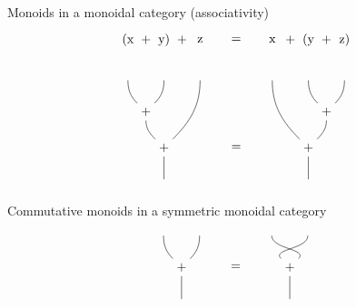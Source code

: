\documentclass[fleqn]{beamer}
\begin{document}
\begin{frame}{Monoids in a monoidal category (associativity)}
  \[
    \begin{tikzpicture}[baseline]
      \path
      (-3,2) node(xl) {}
      (-2,2) node(yl) {}
      (-1,2) node(zl) {}
      (-2.5,1) node(x+y) {+}
      (-2,0) node(xy+z) {+}
      (-2,-1) node(resl) {}
      ;
      \path
      (-3,3) node {(x}
      (-2.5,3) node {+}
      (-2,3) node {y)}
      (-1.5,3) node {+}
      (-1,3) node {z}
      ;

      \draw (xl) to[out=270,in=135] (x+y);
      \draw (yl) to[out=270,in=45] (x+y);
      \draw (x+y) to[out=270,in=135] (xy+z);
      \draw (zl) to[out=270,in=45] (xy+z);
      \draw (xy+z) -- (resl);

      \path
      (0,0) node {=}
      (0,3) node {=}
      ;

      \path
      (3,2) node(zr) {}
      (2,2) node(yr) {}
      (1,2) node(xr) {}
      (2.5,1) node(y+z) {+}
      (2,0) node(x+yz) {+}
      (2,-1) node(resr) {}
      ;
      \path
      (3,3) node {z)}
      (2.5,3) node {+}
      (2,3) node {(y}
      (1.5,3) node {+}
      (1,3) node {x}
      ;

      \draw (zr) to[out=270,in=45] (y+z);
      \draw (yr) to[out=270,in=135] (y+z);
      \draw (y+z) to[out=270,in=45] (x+yz);
      \draw (xr) to[out=270,in=135] (x+yz);
      \draw (x+yz) -- (resr);
    \end{tikzpicture}
  \]
\end{frame}

\begin{frame}{Commutative monoids in a symmetric monoidal category}
  \[
    \begin{tikzpicture}[baseline]
      \path
      (-2,1) node(xl) {}
      (-1,1) node(yl) {}
      (-1.5,0) node(+l) {+}
      (-1.5,-1) node(resl) {}
      ;

      \draw (xl) to[out=270,in=135] (+l);
      \draw (yl) to[out=270,in=45] (+l);
      \draw (+l) to (resl);

      \node at (0,0) {=};

      \path
      (2,1) node(xr) {}
      (1,1) node(yr) {}
      (1.5,0) node(+r) {+}
      (1.5,-1) node(resr) {}
      ;

      \draw (xr) to[out=270,in=135] (+r);
      \draw (yr) to[out=270,in=45] (+r);
      \draw (+r) to (resr);
    \end{tikzpicture}
  \]
\end{frame}
\end{document}
